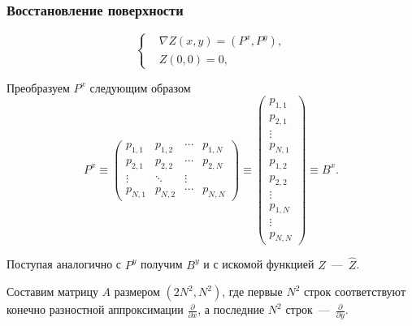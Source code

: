 \documentclass{beamer}
\begin{document}
\begin{frame}[allowframebreaks]
    \frametitle{Восстановление поверхности}

    \begin{displaymath}
        \left\{
            \begin{split}
        &\nabla Z(x,y) = (P^x, P^y), \\
        &Z(0,0) = 0,
            \end{split}
        \right.
    \end{displaymath}

    Преобразуем $P^x$ следующим образом
    \begin{equation}
        P^x \equiv
        \left(
            \begin{array}{cccc}
                p_{1,1} & p_{1,2} & \cdots & p_{1,N} \\
                p_{2,1} & p_{2,2} & \cdots & p_{2,N} \\
                \vdots & \ddots & \vdots  \\
                p_{N,1} & p_{N,2} & \cdots & p_{N,N}
            \end{array}
        \right)
        \equiv{}
        \left(%
            \begin{array}{c}
                p_{1,1} \\
                p_{2,1} \\
                \vdots \\
                p_{N,1} \\
                p_{1,2} \\
                p_{2,2} \\
                \vdots \\
                p_{1,N} \\
                \vdots \\
                p_{N,N}
            \end{array}
        \right)
        \equiv{}  B^x.
    \end{equation}

    Поступая аналогично с $P^y$ получим $B^y$ и с искомой функцией $Z$~---~$\hat{Z}$.

    Составим матрицу $A$ размером $(2N^2, N^2)$, где первые $N^2$ строк соответствуют конечно разностной аппроксимации $\frac{\partial}{\partial x}$, а последние $N^2$ строк~---~$\frac{\partial}{\partial y}$.


\end{frame}
\end{document}
